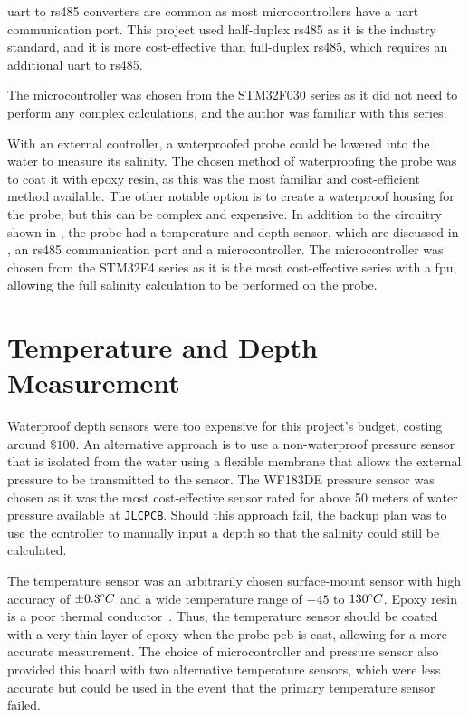 \Gls{uart} to \gls{rs485} converters are common as most microcontrollers have a \gls{uart} communication port.
This project used half-duplex \gls{rs485} as it is the industry standard, and it is more cost-effective than full-duplex \gls{rs485}, which requires an additional \gls{uart} to \gls{rs485}.

The microcontroller was chosen from the STM32F030 series as it did not need to perform any complex calculations, and the author was familiar with this series.

With an external controller, a waterproofed probe could be lowered into the water to measure its salinity.
The chosen method of waterproofing the probe was to coat it with epoxy resin, as this was the most familiar and cost-efficient method available.
The other notable option is to create a waterproof housing for the probe, but this can be complex and expensive.
In addition to the circuitry shown in , the probe had a temperature and depth sensor, which are discussed in , an \gls{rs485} communication port and a microcontroller.
The microcontroller was chosen from the STM32F4 series as it is the most cost-effective series with a \gls{fpu}, allowing the full salinity calculation to be performed on the probe.

\section{Temperature and Depth Measurement}\label{sec:temp-depth-measurement}

Waterproof depth sensors were too expensive for this project's budget, costing around $\$100$.
An alternative approach is to use a non-waterproof pressure sensor that is isolated from the water using a flexible membrane that allows the external pressure to be transmitted to the sensor.
The WF183DE pressure sensor was chosen as it was the most cost-effective sensor rated for above 50 meters of water pressure available at \texttt{JLCPCB}.
Should this approach fail, the backup plan was to use the controller to manually input a depth so that the salinity could still be calculated.

The temperature sensor was an arbitrarily chosen surface-mount sensor with high accuracy of $\pm 0.3\degree C$ and a wide temperature range of $-45$ to $130\degree C$.
Epoxy resin is a poor thermal conductor~\cite{epotek_thermally_conductive_epoxies}. 
Thus, the temperature sensor should be coated with a very thin layer of epoxy when the probe \gls{pcb} is cast, allowing for a more accurate measurement.
The choice of microcontroller and pressure sensor also provided this board with two alternative temperature sensors, which were less accurate but could be used in the event that the primary temperature sensor failed.